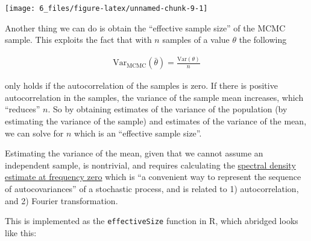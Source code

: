 \documentclass[]{article}
\newenvironment{Shaded}{\begin{snugshade}}{\end{snugshade}}
\newcommand{\ControlFlowTok}[1]{\textcolor[rgb]{0.13,0.29,0.53}{\textbf{#1}}}
\newcommand{\DataTypeTok}[1]{\textcolor[rgb]{0.13,0.29,0.53}{#1}}
\newcommand{\DecValTok}[1]{\textcolor[rgb]{0.00,0.00,0.81}{#1}}
\newcommand{\KeywordTok}[1]{\textcolor[rgb]{0.13,0.29,0.53}{\textbf{#1}}}
\newcommand{\NormalTok}[1]{#1}
\newcommand{\OperatorTok}[1]{\textcolor[rgb]{0.81,0.36,0.00}{\textbf{#1}}}
\newcommand{\StringTok}[1]{\textcolor[rgb]{0.31,0.60,0.02}{#1}}
\begin{document}
\begin{Shaded}
\end{Shaded}

\begin{center}\texttt{[image: 6\_files/figure-latex/unnamed-chunk-9-1]} \end{center}

Another thing we can do is obtain the ``effective sample size'' of the
MCMC sample. This exploits the fact that with \(n\) samples of a value
\(\theta\) the following

\begin{align}
\text{Var}_{\text{MCMC}}(\bar{\theta}) = \frac{\text{Var}(\theta)}{n}
\end{align}

only holds if the autocorrelation of the samples is zero. If there is
positive autocorrelation in the samples, the variance of the sample mean
increases, which ``reduces'' \(n\). So by obtaining estimates of the
variance of the population (by estimating the variance of the sample)
and estimates of the variance of the mean, we can solve for \(n\) which
is an ``effective sample size''.

Estimating the variance of the mean, given that we cannot assume an
independent sample, is nontrivial, and requires calculating the
\href{http://faculty.arts.ubc.ca/vmarmer/econ627/627_10_02.pdf}{spectral
density estimate at frequency zero} which is ``a convenient way to
represent the sequence of autocovariances'' of a stochastic process, and
is related to 1) autocorrelation, and 2) Fourier transformation.

This is implemented as the \texttt{effectiveSize} function in R, which
abridged looks like this:

\begin{Shaded}
\end{Shaded}
\end{document}
